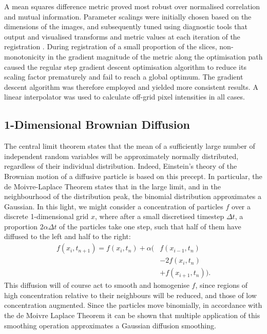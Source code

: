     A mean squares difference metric proved most robust over normalised correlation and mutual information. Parameter scalings were initially chosen based on the dimensions of the images, and subsequently tuned using diagnostic tools that output and visualised transforms and metric values at each iteration of the registration \cite{github_registration}. During registration of a small proportion of the slices, non-monotonicity in the gradient magnitude of the metric along the optimisation path caused the regular step gradient descent optimisation algorithm to reduce its scaling factor prematurely and fail to reach a global optimum. The gradient descent algorithm was therefore employed and yielded more consistent results. A linear interpolator was used to calculate off-grid pixel intensities in all cases.
  
	\subsection{1-Dimensional Brownian Diffusion} %
	\label{sub:a_1d_random_walk_analogy}
    The central limit theorem states that the mean of a sufficiently large number of independent random variables will be approximately normally distributed, regardless of their individual distribution. Indeed, Einstein's theory of the Brownian motion of a diffusive particle is based on this precept. In particular, the de Moivre-Laplace Theorem states that in the large limit, and in the neighbourhood of the distribution peak, the binomial distribution approximates a Gaussian. In this light, we might consider a concentration of particles $f$ over a discrete 1-dimensional grid $x$, where after a small discretised timestep $\Delta t$, a proportion $2\alpha \Delta t$ of the particles take one step, such that half of them have diffused to the left and half to the right:
	  \begin{equation}
      \begin{split}
  	    f(x_i, t_{n+1}) = f(x_i, t_n) + \alpha (& f(x_{i-1}, t_n) \\
                                                & - 2f(x_i, t_n) \\
                                                & + f(x_{i+1}, t_n)).
      \end{split}
      \label{eqn:diffusion_1d}
		\end{equation}
	  This diffusion will of course act to smooth and homogenise $f$, since regions of high concentration relative to their neighbours will be reduced, and those of low concentration augmented. Since the particles move binomially, in accordance with the de Moivre Laplace Theorem it can be shown that multiple application of this smoothing operation approximates a Gaussian diffusion smoothing.
	
